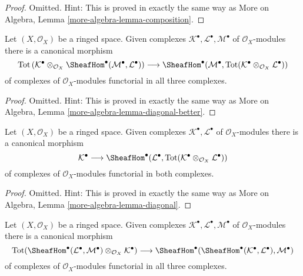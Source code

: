 \begin{proof}
Omitted. Hint: This is proved in exactly the same way as
More on Algebra, Lemma \ref{more-algebra-lemma-composition}.
\end{proof}

\begin{lemma}
\label{lemma-diagonal-better}
Let $(X, \mathcal{O}_X)$ be a ringed space. Given complexes
$\mathcal{K}^\bullet, \mathcal{L}^\bullet, \mathcal{M}^\bullet$
of $\mathcal{O}_X$-modules there is a canonical morphism
$$
\text{Tot}\left(
\mathcal{K}^\bullet \otimes_{\mathcal{O}_X}
\SheafHom^\bullet(\mathcal{M}^\bullet, \mathcal{L}^\bullet)
\right)
\longrightarrow
\SheafHom^\bullet(\mathcal{M}^\bullet,
\text{Tot}(\mathcal{K}^\bullet \otimes_{\mathcal{O}_X} \mathcal{L}^\bullet))
$$
of complexes of $\mathcal{O}_X$-modules functorial in all three complexes.
\end{lemma}

\begin{proof}
Omitted. Hint: This is proved in exactly the same way as
More on Algebra, Lemma \ref{more-algebra-lemma-diagonal-better}.
\end{proof}

\begin{lemma}
\label{lemma-diagonal}
Let $(X, \mathcal{O}_X)$ be a ringed space. Given complexes
$\mathcal{K}^\bullet, \mathcal{L}^\bullet$
of $\mathcal{O}_X$-modules there is a canonical morphism
$$
\mathcal{K}^\bullet
\longrightarrow
\SheafHom^\bullet(\mathcal{L}^\bullet,
\text{Tot}(\mathcal{K}^\bullet \otimes_{\mathcal{O}_X} \mathcal{L}^\bullet))
$$
of complexes of $\mathcal{O}_X$-modules functorial in both complexes.
\end{lemma}

\begin{proof}
Omitted. Hint: This is proved in exactly the same way as
More on Algebra, Lemma \ref{more-algebra-lemma-diagonal}.
\end{proof}

\begin{lemma}
\label{lemma-evaluate-and-more}
Let $(X, \mathcal{O}_X)$ be a ringed space. Given complexes
$\mathcal{K}^\bullet, \mathcal{L}^\bullet, \mathcal{M}^\bullet$
of $\mathcal{O}_X$-modules there is a canonical morphism
$$
\text{Tot}(\SheafHom^\bullet(\mathcal{L}^\bullet,
\mathcal{M}^\bullet) \otimes_{\mathcal{O}_X} \mathcal{K}^\bullet)
\longrightarrow
\SheafHom^\bullet(\SheafHom^\bullet(\mathcal{K}^\bullet,
\mathcal{L}^\bullet), \mathcal{M}^\bullet)
$$
of complexes of $\mathcal{O}_X$-modules functorial in all three complexes.
\end{lemma}

